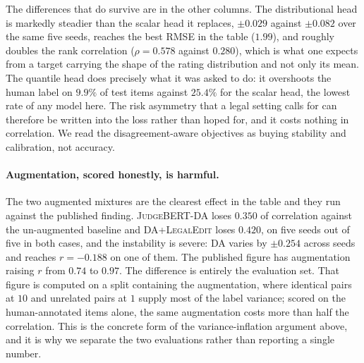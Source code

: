 \documentclass[11pt]{article}
\begin{document}
The differences that do survive are in the other columns. The distributional
head is markedly steadier than the scalar head it replaces, $\pm0.029$ against
$\pm0.082$ over the same five seeds, reaches the best RMSE in the table
($1.99$), and roughly doubles the rank correlation ($\rho=0.578$ against
$0.280$), which is what one expects from a target carrying the shape of the
rating distribution and not only its mean. The quantile head does precisely what
it was asked to do: it overshoots the human label on $9.9\%$ of test items
against $25.4\%$ for the scalar head, the lowest rate of any model here. The
risk asymmetry that a legal setting calls for can therefore be written into the
loss rather than hoped for, and it costs nothing in correlation. We read the
disagreement-aware objectives as buying stability and calibration, not accuracy.

\paragraph{Augmentation, scored honestly, is harmful.}
The two augmented mixtures are the clearest effect in the table and they run
against the published finding. \textsc{JudgeBERT}-DA loses $0.350$ of
correlation against the un-augmented baseline and \textsc{DA+LegalEdit} loses
$0.420$, on five seeds out of five in both cases, and the instability is severe:
DA varies by $\pm0.254$ across seeds and reaches $r=-0.188$ on one of them. The
published figure has augmentation raising $r$ from $0.74$ to $0.97$. The
difference is entirely the evaluation set. That figure is computed on a split
containing the augmentation, where identical pairs at $10$ and unrelated pairs
at $1$ supply most of the label variance; scored on the human-annotated items
alone, the same augmentation costs more than half the correlation. This is the
concrete form of the variance-inflation argument above, and it is why we
separate the two evaluations rather than reporting a single number.
\end{document}

